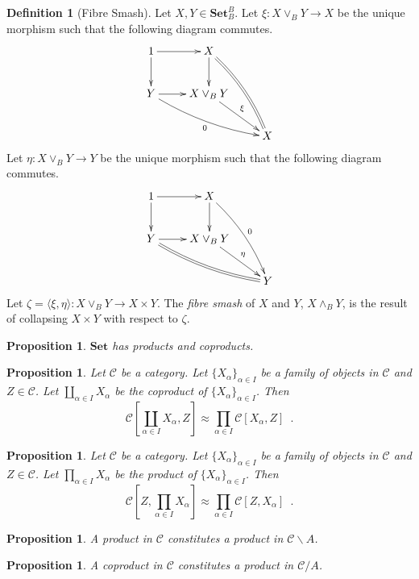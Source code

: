 \documentclass{book}
\newtheorem{prop}[ax]{Proposition}
\theoremstyle{definition}
\newtheorem{df}[ax]{Definition}
\newcommand{\Set}{\ensuremath{\mathbf{Set}}}
\begin{document}
\begin{df}[Fibre Smash]
Let $X, Y \in \Set_B^B$. Let $\xi : X \vee_B Y \rightarrow X$ be the unique morphism such that the following diagram commutes.
\[ \xymatrix{
1 \ar[r] \ar[d] & X \ar[d] \ar@{=}@/^/[ddr] \\
Y \ar[r] \ar@/_/[drr]_0 & X \vee_B Y \ar[dr]^\xi \\
& & X
} \]
Let $\eta : X \vee_B Y \rightarrow Y$ be the unique morphism such that the following diagram commutes.
\[ \xymatrix{
1 \ar[r] \ar[d] & X \ar[d] \ar@/^/[ddr]^0 \\
Y \ar[r] \ar@{=}@/_/[drr] & X \vee_B Y \ar[dr]^\eta \\
& & Y
} \]
Let $\zeta = \langle \xi, \eta \rangle : X \vee_B Y \rightarrow X \times Y$. The \emph{fibre smash} of $X$ and $Y$, $X \wedge_B Y$, is the result of collapsing $X \times Y$ with respect to $\zeta$.
\end{df}

\begin{prop}
$\mathbf{Set}$ has products and coproducts.
\end{prop}

\begin{prop}
Let $\mathcal{C}$ be a category. Let $\{X_\alpha\}_{\alpha \in I}$ be a family of objects in $\mathcal{C}$ and $Z \in \mathcal{C}$. Let $\coprod_{\alpha \in I} X_\alpha$ be the coproduct of $\{ X_\alpha \}_{\alpha \in I}$. Then
\[ \mathcal{C}[\coprod_{\alpha \in I} X_\alpha, Z] \approx \prod_{\alpha \in I} \mathcal{C}[X_\alpha, Z] \enspace . \]
\end{prop}

\begin{prop}
Let $\mathcal{C}$ be a category. Let $\{X_\alpha\}_{\alpha \in I}$ be a family of objects in $\mathcal{C}$ and $Z \in \mathcal{C}$. Let $\prod_{\alpha \in I} X_\alpha$ be the product of $\{ X_\alpha \}_{\alpha \in I}$. Then
\[ \mathcal{C}[Z, \prod_{\alpha \in I} X_\alpha] \approx \prod_{\alpha \in I} \mathcal{C}[Z, X_\alpha] \enspace . \]
\end{prop}

\begin{prop}
A product in $\mathcal{C}$ constitutes a product in $\mathcal{C} \backslash A$.
\end{prop}

\begin{prop}
A coproduct in $\mathcal{C}$ constitutes a product in $\mathcal{C} / A$.
\end{prop}
\end{document}
